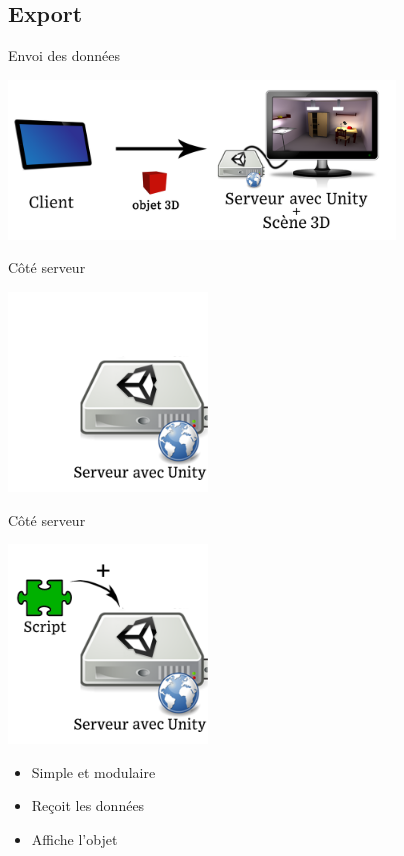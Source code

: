 \documentclass[a4paper,10pt]{beamer}
\begin{document}
	\subsection{Export}
	\begin{frame}{Envoi des données}
		\centerline{\includegraphics[height=120pt]{images/network/sending_model2.png}}
	\end{frame}
	
	
	\begin{frame}{Côté serveur}
		\centerline{\includegraphics[height=150pt]{images/network/plugin1.png}}
		
	\end{frame}
	\begin{frame}{Côté serveur}
		\centerline{\includegraphics[height=150pt]{images/network/plugin.png}}
		\begin{itemize}	
			\item \pause Simple et modulaire \pause
			\item Reçoit les données \pause
			\item Affiche l'objet 
		\end{itemize}	
		
	\end{frame}
	
\end{document}
